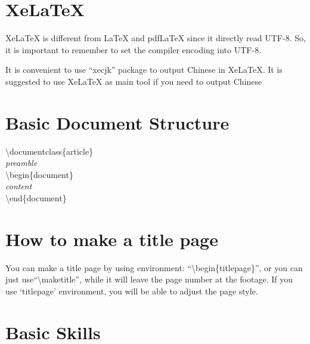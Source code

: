 \documentclass[10pt,a4paper,fleqn]{article}
\def\bslash{\textbackslash} %
\begin{document}
\section*{XeLaTeX}
XeLaTeX is different from LaTeX and pdfLaTeX since it directly read UTF-8. So, it is important to remember to set the compiler encoding into UTF-8.

It is convenient to use ``xecjk'' package to output Chinese in XeLaTeX. It is suggested to use XeLaTeX as main tool if you need to output Chinese
\pagebreak

\section{Basic Document Structure}
\bslash documentclass\{article\}\\
\textit{preamble}\\
\bslash begin\{document\}\\
\textit{content}\\
\bslash end\{document\}

\section{How to make a title page}
You can make a title page by using environment: ``\bslash begin\{titlepage\}'',
or you can just use``\textbackslash maketitle'', while it will leave the page number at the footage. If you use `titlepage' environment, you will be able to adjust the page style.

\section{Basic Skills}
\end{document}
